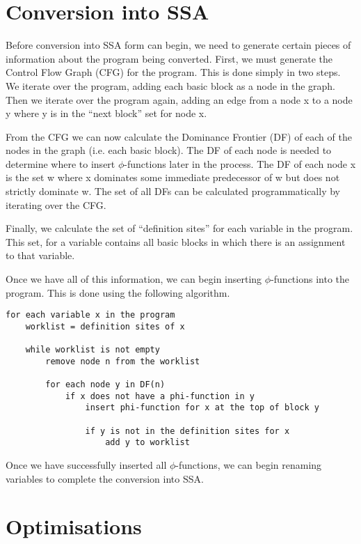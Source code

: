 \documentclass[a4paper,10pt]{report}
\begin{document}
\section{Conversion into SSA}
Before conversion into SSA form can begin, we need to generate certain pieces of information about the program being converted.
First, we must generate the Control Flow Graph (CFG) for the program. This is done simply in two steps. We iterate over
the program, adding each basic block as a node in the graph. Then we iterate over the program again, adding an edge from a node
x to a node y where y is in the ``next block'' set for node x.

From the CFG we can now calculate the Dominance Frontier (DF) of each of the nodes in the graph (i.e. each basic block).
The DF of each node is needed to determine where to insert \(\phi\)-functions later in the process. The DF of each node x is 
the set {w} where x dominates some immediate predecessor of w but does not strictly dominate w. The set of all DFs can be 
calculated programmatically by iterating over the CFG.

Finally, we calculate the set of ``definition sites'' for each variable in the program. This set, for a variable contains 
all basic blocks in which there is an assignment to that variable.

Once we have all of this information, we can begin inserting \(\phi\)-functions into the program. This is done using the
following algorithm.

\begin{verbatim}
for each variable x in the program
    worklist = definition sites of x

    while worklist is not empty
        remove node n from the worklist

        for each node y in DF(n)
            if x does not have a phi-function in y
                insert phi-function for x at the top of block y

                if y is not in the definition sites for x
                    add y to worklist
\end{verbatim}

Once we have successfully inserted all \(\phi\)-functions, we can begin renaming variables to complete the conversion into
SSA. 



\section{Optimisations}
\end{document}
